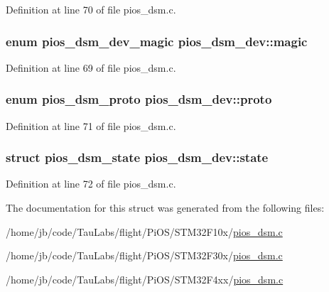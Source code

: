 \-Definition at line 70 of file pios\-\_\-dsm.\-c.

\hypertarget{structpios__dsm__dev_af1374f09784777b8222cd59d6c41ba1f}{
\subsubsection[{magic}]{\setlength{\rightskip}{0pt plus 5cm}enum {\bf pios\-\_\-dsm\-\_\-dev\-\_\-magic} {\bf pios\-\_\-dsm\-\_\-dev\-::magic}}}\label{structpios__dsm__dev_af1374f09784777b8222cd59d6c41ba1f}


\-Definition at line 69 of file pios\-\_\-dsm.\-c.

\hypertarget{structpios__dsm__dev_a1f236c86046b7aa2f08742d1c9c03940}{
\subsubsection[{proto}]{\setlength{\rightskip}{0pt plus 5cm}enum {\bf pios\-\_\-dsm\-\_\-proto} {\bf pios\-\_\-dsm\-\_\-dev\-::proto}}}\label{structpios__dsm__dev_a1f236c86046b7aa2f08742d1c9c03940}


\-Definition at line 71 of file pios\-\_\-dsm.\-c.

\hypertarget{structpios__dsm__dev_a03ca4dcf548ecee1772b76d3eefad122}{
\subsubsection[{state}]{\setlength{\rightskip}{0pt plus 5cm}struct {\bf pios\-\_\-dsm\-\_\-state} {\bf pios\-\_\-dsm\-\_\-dev\-::state}}}\label{structpios__dsm__dev_a03ca4dcf548ecee1772b76d3eefad122}


\-Definition at line 72 of file pios\-\_\-dsm.\-c.



\-The documentation for this struct was generated from the following files\-:\begin{DoxyCompactItemize}
\item 
/home/jb/code/\-Tau\-Labs/flight/\-Pi\-O\-S/\-S\-T\-M32\-F10x/\hyperlink{_s_t_m32_f10x_2pios__dsm_8c}{pios\-\_\-dsm.\-c}\item 
/home/jb/code/\-Tau\-Labs/flight/\-Pi\-O\-S/\-S\-T\-M32\-F30x/\hyperlink{_s_t_m32_f30x_2pios__dsm_8c}{pios\-\_\-dsm.\-c}\item 
/home/jb/code/\-Tau\-Labs/flight/\-Pi\-O\-S/\-S\-T\-M32\-F4xx/\hyperlink{_s_t_m32_f4xx_2pios__dsm_8c}{pios\-\_\-dsm.\-c}\end{DoxyCompactItemize}
